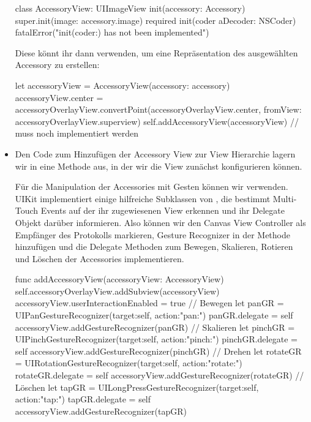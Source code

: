 \documentclass[parskip=half, final]{scrreprt}
\begin{document}
\begin{lecture}
\begin{itemize}
\begin{swiftcode}
class AccessoryView: UIImageView {    
    init(accessory: Accessory) {
        super.init(image: accessory.image)
    }
    required init(coder aDecoder: NSCoder) {
        fatalError("init(coder:) has not been implemented")
    }
}	
\end{swiftcode}

	Diese könnt ihr dann verwenden, um eine Repräsentation des ausgewählten Accessory zu erstellen:
\begin{swiftcode}
        let accessoryView = AccessoryView(accessory: accessory)
        accessoryView.center = accessoryOverlayView.convertPoint(accessoryOverlayView.center, fromView: accessoryOverlayView.superview)
        self.addAccessoryView(accessoryView) // muss noch implementiert werden
\end{swiftcode}

\item Den Code zum Hinzufügen der Accessory View zur View Hierarchie lagern wir in eine Methode  aus, in der wir die View zunächst konfigurieren können.

Für die Manipulation der Accessories mit Gesten können wir  verwenden. UIKit implementiert einige hilfreiche Subklassen von , die bestimmt Multi-Touch Events auf der ihr zugewiesenen View erkennen und ihr Delegate Objekt darüber informieren. Also können wir den Canvas View Controller als Empfänger des  Protokolls markieren, Gesture Recognizer in der  Methode hinzufügen und die Delegate Methoden zum Bewegen, Skalieren, Rotieren und Löschen der Accessories implementieren.

\begin{swiftcode}
    func addAccessoryView(accessoryView: AccessoryView) {
        self.accessoryOverlayView.addSubview(accessoryView)
        accessoryView.userInteractionEnabled = true
        // Bewegen
        let panGR = UIPanGestureRecognizer(target:self, action:"pan:")
        panGR.delegate = self
        accessoryView.addGestureRecognizer(panGR)
        // Skalieren
        let pinchGR = UIPinchGestureRecognizer(target:self, action:"pinch:")
        pinchGR.delegate = self
        accessoryView.addGestureRecognizer(pinchGR)
        // Drehen
        let rotateGR = UIRotationGestureRecognizer(target:self, action:"rotate:")
        rotateGR.delegate = self
        accessoryView.addGestureRecognizer(rotateGR)
        // Löschen
        let tapGR = UILongPressGestureRecognizer(target:self, action:"tap:")
        tapGR.delegate = self
        accessoryView.addGestureRecognizer(tapGR)
    }
    

\end{swiftcode}
\end{itemize}
\end{lecture}
\end{document}
